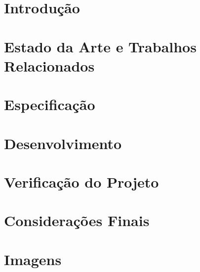 \documentclass[]{politex}
\begin{document}
\listadefiguras
\listadetabelas


\sumario


\chapter{Introdução} \label{cap:introducao}


\chapter{Estado da Arte e Trabalhos Relacionados} \label{cap:arte} %


\chapter{Especificação}


\chapter{Desenvolvimento}


\chapter{Verificação do Projeto}


\chapter{Considerações Finais}


\appendix
\chapter{Imagens}



%




\end{document}
